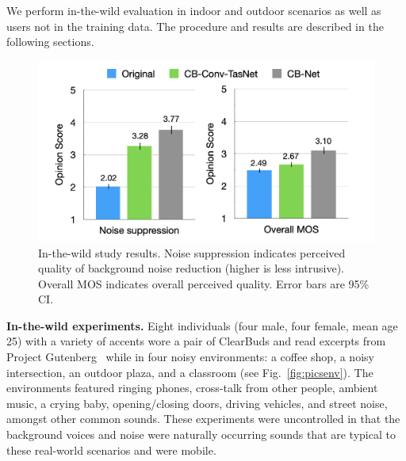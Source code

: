 \documentclass [11pt, proquest] {uwthesis}[2020/02/24]
\begin{document}
We perform in-the-wild evaluation   in  indoor and outdoor scenarios as well as users not in the training data.
The procedure and results are described in the following sections.


\begin{figure}
\centering
\includegraphics[width=0.65\linewidth]{CB_figures/MOS_study_results_v3.png}
\vskip -0.15in
\caption{In-the-wild study results. Noise suppression indicates perceived quality of background noise reduction (higher is less intrusive). Overall MOS indicates overall perceived quality. Error bars are 95\% CI.} %
\vskip -0.2in
\label{fig:mos}
\end{figure}



{\bf In-the-wild experiments.} Eight individuals (four male, four female, mean age 25) with a variety of accents wore a pair of ClearBuds and read excerpts from Project Gutenberg~\cite{gutenberg}  while in four noisy environments: a coffee shop, a noisy intersection, an outdoor plaza, and a classroom (see Fig.~\ref{fig:picsenv}). The environments featured ringing phones, cross-talk from other people, ambient music, a crying baby, opening/closing doors, driving vehicles, and street noise, amongst other common sounds. These experiments  were uncontrolled in that the background voices and noise were naturally occurring sounds that are  typical to these real-world scenarios and were mobile.
\end{document}
